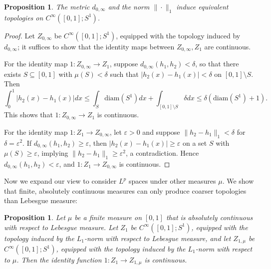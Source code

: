 \documentclass[11pt, reqno, english]{amsart}
\theoremstyle{plain}
\newtheorem{proposition}[theorem]{Proposition}
\theoremstyle{definition}
\begin{document}
\begin{proposition}\label{equivalent}
  The metric $d_{0, \infty}$ and the norm $\|\cdot\|_{1}$ induce equivalent topologies on
  $C^{\infty}([0, 1]; S^{1})$.
\end{proposition}

\begin{proof}
  Let $Z_{0, \infty}$ be $C^{\infty}([0, 1]; S^{1})$, equipped with the
  topology induced by $d_{0, \infty}$; it suffices to show that the identity
  maps between  $Z_{0, \infty}, Z_{1}$ are continuous.

  For the identity map $1\colon Z_{0, \infty} \rightarrow Z_{1}$, suppose
  $d_{0, \infty}(h_{1}, h_{2}) < \delta$, so that there exists $S \subseteq [0,
  1]$ with $\mu(S) < \delta$ such that $|h_{2}(x) - h_{1}(x)| < \delta$ on $[0,
  1] \setminus S$. Then
  $$\int_{0}^{1}|h_{2}(x) - h_{1}(x)|dx \le \int_{S}\text{diam}(S^{1})dx +
  \int_{[0, 1] \setminus S}\delta dx \le \delta (\text{diam}(S^{1}) + 1).$$
  This shows that $1\colon Z_{0, \infty} \rightarrow Z_{1}$ is continuous.
  
  For the identity map $1\colon Z_{1} \rightarrow Z_{0, \infty}$, let
  $\varepsilon > 0$ and suppose $\|h_{2} - h_{1}\|_{1} < \delta$ for $\delta =
  \varepsilon^{2}$. If $d_{0, \infty}(h_{1}, h_{2}) \ge \varepsilon$, then
  $|h_{2}(x) - h_{1}(x)| \ge \varepsilon$ on a set $S$ with $\mu(S) \ge
  \varepsilon$, implying $\|h_{2} - h_{1}\|_{1} \ge \varepsilon^{2}$, a
  contradiction. Hence $d_{0, \infty}(h_{1}, h_{2}) < \varepsilon$, and
  $1\colon Z_{1} \rightarrow Z_{0, \infty}$ is continuous.
\end{proof}

Now we expand our view to consider $L^{p}$ spaces under other measures $\mu$.
We show that finite, absolutely continuous measures can only produce coarser
topologies than Lebesgue measure:

\begin{proposition}
  Let $\mu$ be a finite measure on $[0, 1]$ that is absolutely continuous with
  respect to Lebesgue measure. Let $Z_{1}$ be $C^{\infty}([0, 1]; S^{1})$,
  equipped with the topology induced by the $L_{1}$-norm with respect to
  Lebesgue measure, and let $Z_{1, \mu}$ be $C^{\infty}([0, 1]; S^{1})$,
  equipped with the topology induced by the $L_{1}$-norm with respect to $\mu$.
  Then the identity function $1\colon Z_{1} \rightarrow Z_{1, \mu}$ is
  continuous.
\end{proposition}
\end{document}
